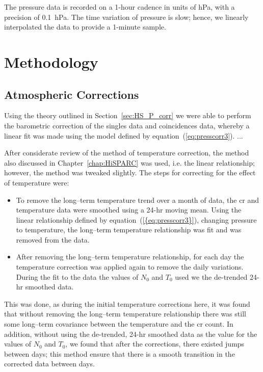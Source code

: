 The pressure data is recorded on a 1-hour cadence in units of hPa, with a precision of 0.1~hPa. The time variation of pressure is slow; hence, we linearly interpolated the data to provide a 1-minute sample.


\section{Methodology}\label{sec:HS_14008_methods}

\subsection{Atmospheric Corrections}

Using the theory outlined in Section~\ref{sec:HS_P_corr} we were able to perform the barometric correction of the singles data and coincidences data, whereby a linear fit was made using the model defined by equation~(\ref{eq:presscorr3}). ...

After considerate review of the method of temperature correction, the method also discussed in Chapter~\ref{chap:HiSPARC} was used, i.e. the linear relationship; however, the method was tweaked slightly. The steps for correcting for the effect of temperature were:

\begin{itemize}
	\item{To remove the long--term temperature trend over a month of data, the \gls{cr} and temperature data were smoothed using a 24-hr moving mean. Using the linear relationship defined by equation~(\ref{{eq:presscorr3}}), changing pressure to temperature, the long--term temperature relationship was fit and was removed from the data.}

	\item{After removing the long--term temperature relationship, for each day the temperature correction was applied again to remove the daily variations. During the fit to the data the values of $N_0$ and $T_0$ used we the de-trended 24-hr smoothed data.}
\end{itemize}

This was done, as during the initial temperature corrections here, it was found that without removing the long--term temperature relationship there was still some long--term covariance between the temperature and the \gls{cr} count. In addition, without using the de-trended, 24-hr smoothed data as the value for the values of $N_0$ and $T_0$, we found that after the corrections, there existed jumps between days; this method ensure that there is a smooth transition in the corrected data between days.


